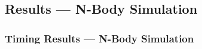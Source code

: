 \documentclass{beamer}
\begin{document}
\subsection{Results --- N-Body Simulation}
\begin{frame}
\frametitle{Timing Results --- N-Body Simulation}
\end{frame}
\end{document}
